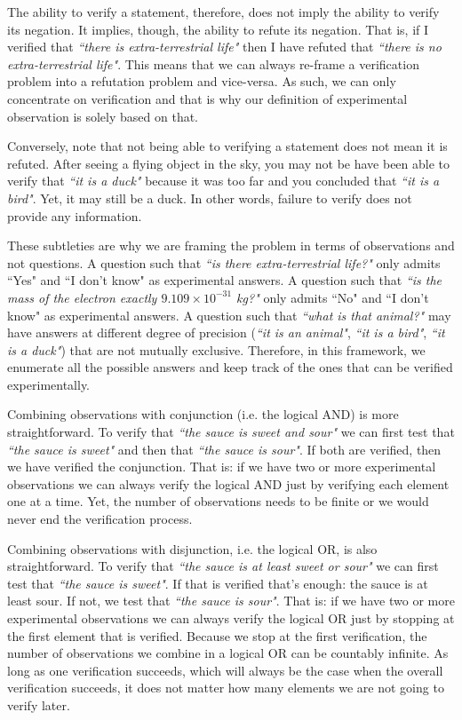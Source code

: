 \documentclass[11pt,letterpaper,fleqn]{memoir} %
\begin{document}
The ability to verify a statement, therefore, does not imply the ability to verify its negation. It implies, though, the ability to refute its negation. That is, if I verified that \emph{``there is extra-terrestrial life"} then I have refuted that \emph{``there is no extra-terrestrial life"}. This means that we can always re-frame a verification problem into a refutation problem and vice-versa. As such, we can only concentrate on verification and that is why our definition of experimental observation is solely based on that.

Conversely, note that not being able to verifying a statement does not mean it is refuted. After seeing a flying object in the sky, you may not be have been able to verify that \emph{``it is a duck"} because it was too far and you concluded that \emph{``it is a bird"}. Yet, it may still be a duck. In other words, failure to verify does not provide any information.

These subtleties are why we are framing the problem in terms of observations and not questions. A question such that \emph{``is there extra-terrestrial life?"} only admits ``Yes" and ``I don't know" as experimental answers. A question such that \emph{``is the mass of the electron exactly $9.109 \times 10^{-31}$ kg?"} only admits ``No" and ``I don't know" as experimental answers. A question such that \emph{``what is that animal?"} may have answers at different degree of precision (\emph{``it is an animal"}, \emph{``it is a bird"}, \emph{``it is a duck"}) that are not mutually exclusive. Therefore, in this framework, we enumerate all the possible answers and keep track of the ones that can be verified experimentally.

Combining observations with conjunction (i.e. the logical AND) is more straightforward. To verify that \emph{``the sauce is sweet and sour"} we can first test that \emph{``the sauce is sweet"} and then that \emph{``the sauce is sour"}. If both are verified, then we have verified the conjunction. That is: if we have two or more experimental observations we can always verify the logical AND just by verifying each element one at a time. Yet, the number of observations needs to be finite or we would never end the verification process.

Combining observations with disjunction, i.e. the logical OR, is also straightforward. To verify that \emph{``the sauce is at least sweet or sour"} we can first test that \emph{``the sauce is sweet"}. If that is verified that's enough: the sauce is at least sour. If not, we test that \emph{``the sauce is sour"}. That is: if we have two or more experimental observations we can always verify the logical OR just by stopping at the first element that is verified. Because we stop at the first verification, the number of observations we combine in a logical OR can be countably infinite. As long as one verification succeeds, which will always be the case when the overall verification succeeds, it does not matter how many elements we are not going to verify later.
\end{document}
